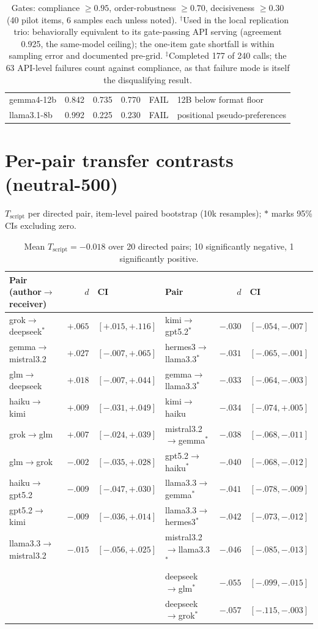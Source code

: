 \documentclass[11pt]{article}
\newcommand{\Tscript}{T_{\mathrm{script}}}
\begin{document}
\begin{table}[H]
\begin{tabular}{lccccl}
gemma4-12b       & 0.842 & 0.735 & 0.770 & FAIL & 12B below format floor \\
llama3.1-8b      & 0.992 & 0.225 & 0.230 & FAIL & positional pseudo-preferences \\
\bottomrule
\end{tabular}
\caption{Gates: compliance $\ge 0.95$, order-robustness $\ge 0.70$,
decisiveness $\ge 0.30$ (40 pilot items, 6 samples each unless noted).
$^\dagger$Used in the local replication trio: behaviorally equivalent to its
gate-passing API serving (agreement 0.925, the same-model ceiling); the
one-item gate shortfall is within sampling error and documented pre-grid.
$^\ddagger$Completed 177 of 240 calls; the 63
API-level failures count against compliance, as that failure mode is itself
the disqualifying result.}
\end{table}

\section{Per-pair transfer contrasts (neutral-500)}
$\Tscript$ per directed pair, item-level paired bootstrap (10k resamples);
$*$ marks 95\% CIs excluding zero.
\begin{table}[H]
\centering\scriptsize
\begin{tabular}{lrl@{\qquad}lrl}
\toprule
Pair (author$\to$receiver) & $d$ & CI & Pair & $d$ & CI \\
\midrule
grok$\to$deepseek$^{*}$ & $+.065$ & $[+.015,+.116]$ & kimi$\to$gpt5.2$^{*}$ & $-.030$ & $[-.054,-.007]$ \\
gemma$\to$mistral3.2 & $+.027$ & $[-.007,+.065]$ & hermes3$\to$llama3.3$^{*}$ & $-.031$ & $[-.065,-.001]$ \\
glm$\to$deepseek & $+.018$ & $[-.007,+.044]$ & gemma$\to$llama3.3$^{*}$ & $-.033$ & $[-.064,-.003]$ \\
haiku$\to$kimi & $+.009$ & $[-.031,+.049]$ & kimi$\to$haiku & $-.034$ & $[-.074,+.005]$ \\
grok$\to$glm & $+.007$ & $[-.024,+.039]$ & mistral3.2$\to$gemma$^{*}$ & $-.038$ & $[-.068,-.011]$ \\
glm$\to$grok & $-.002$ & $[-.035,+.028]$ & gpt5.2$\to$haiku$^{*}$ & $-.040$ & $[-.068,-.012]$ \\
haiku$\to$gpt5.2 & $-.009$ & $[-.047,+.030]$ & llama3.3$\to$gemma$^{*}$ & $-.041$ & $[-.078,-.009]$ \\
gpt5.2$\to$kimi & $-.009$ & $[-.036,+.014]$ & llama3.3$\to$hermes3$^{*}$ & $-.042$ & $[-.073,-.012]$ \\
llama3.3$\to$mistral3.2 & $-.015$ & $[-.056,+.025]$ & mistral3.2$\to$llama3.3$^{*}$ & $-.046$ & $[-.085,-.013]$ \\
 & & & deepseek$\to$glm$^{*}$ & $-.055$ & $[-.099,-.015]$ \\
 & & & deepseek$\to$grok$^{*}$ & $-.057$ & $[-.115,-.003]$ \\
\bottomrule
\end{tabular}
\caption{Mean $\Tscript = -0.018$ over 20 directed pairs; 10 significantly
negative, 1 significantly positive.}
\end{table}
\end{document}
